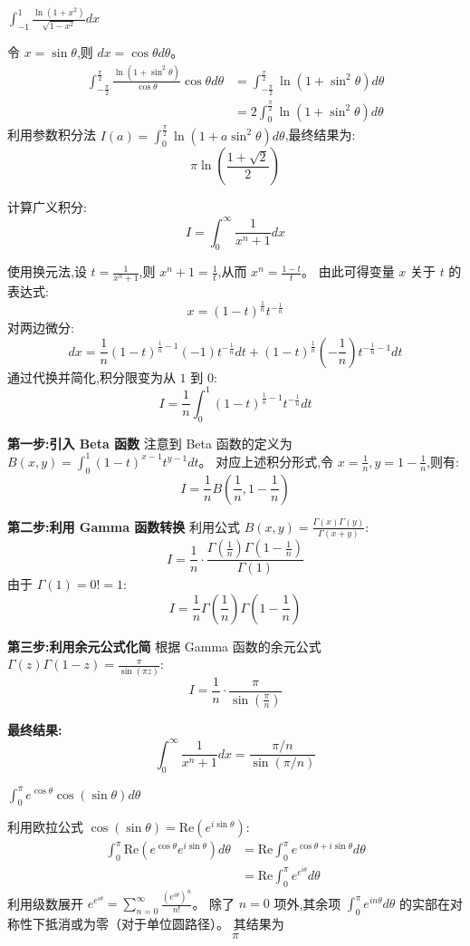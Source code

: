 \begin{questions}
\question $\int_{-1}^{1} \frac{\ln(1+x^2)}{\sqrt{1-x^2}} dx$
\begin{solution}
令 $x = \sin \theta$,则 $dx = \cos \theta d\theta$。
\begin{align*}
\int_{-\frac{\pi}{2}}^{\frac{\pi}{2}} \frac{\ln(1+\sin^2 \theta)}{\cos \theta} \cos \theta d\theta &= \int_{-\frac{\pi}{2}}^{\frac{\pi}{2}} \ln(1+\sin^2 \theta) d\theta \\
&= 2 \int_{0}^{\frac{\pi}{2}} \ln(1+\sin^2 \theta) d\theta
\end{align*}
利用参数积分法 $I(a) = \int_{0}^{\frac{\pi}{2}} \ln(1+a\sin^2 \theta) d\theta$,最终结果为:
\[ \pi \ln(\frac{1+\sqrt{2}}{2}) \]
\end{solution}
\question 
计算广义积分:\[ I = \int_{0}^{\infty} \frac{1}{x^n + 1} dx \]

\begin{solution}
使用换元法,设 $t = \frac{1}{x^n+1}$,则 $x^n+1 = \frac{1}{t}$,从而 $x^n = \frac{1-t}{t}$。
由此可得变量 $x$ 关于 $t$ 的表达式:
\[ x = (1-t)^{\frac{1}{n}} t^{-\frac{1}{n}} \]
对两边微分:
\[ dx = \frac{1}{n}(1-t)^{\frac{1}{n}-1}(-1) t^{-\frac{1}{n}} dt + (1-t)^{\frac{1}{n}} (-\frac{1}{n}) t^{-\frac{1}{n}-1} dt \]
通过代换并简化,积分限变为从 $1$ 到 $0$:
\[ I = \frac{1}{n} \int_{0}^{1} (1-t)^{\frac{1}{n}-1} t^{-\frac{1}{n}} dt \]

\textbf{第一步:引入 Beta 函数}
注意到 Beta 函数的定义为 $B(x, y) = \int_{0}^{1} (1-t)^{x-1} t^{y-1} dt$。
对应上述积分形式,令 $x = \frac{1}{n},y = 1 - \frac{1}{n}$,则有:
\[ I = \frac{1}{n} B\left(\frac{1}{n}, 1 - \frac{1}{n}\right) \]

\textbf{第二步:利用 Gamma 函数转换}
利用公式 $B(x, y) = \frac{\Gamma(x)\Gamma(y)}{\Gamma(x+y)}$:
\[ I = \frac{1}{n} \cdot \frac{\Gamma(\frac{1}{n})\Gamma(1 - \frac{1}{n})}{\Gamma(1)} \]
由于 $\Gamma(1) = 0! = 1$:
\[ I = \frac{1}{n} \Gamma\left(\frac{1}{n}\right)\Gamma\left(1 - \frac{1}{n}\right) \]

\textbf{第三步:利用余元公式化简}
根据 Gamma 函数的余元公式 $\Gamma(z)\Gamma(1-z) = \frac{\pi}{\sin(\pi z)}$:
\[ I = \frac{1}{n} \cdot \frac{\pi}{\sin(\frac{\pi}{n})} \]

\textbf{最终结果:}
\[ \int_{0}^{\infty} \frac{1}{x^n + 1} dx = \frac{\pi/n}{\sin(\pi/n)} \]
\end{solution}
\question $\int_{0}^{\pi} e^{\cos \theta} \cos(\sin \theta) d\theta$
\begin{solution}
利用欧拉公式 $\cos(\sin \theta) = \text{Re}(e^{i\sin \theta})$:
\begin{align*}
\int_{0}^{\pi} \text{Re}(e^{\cos \theta} e^{i\sin \theta}) d\theta &= \text{Re} \int_{0}^{\pi} e^{\cos \theta + i\sin \theta} d\theta \\
&= \text{Re} \int_{0}^{\pi} e^{e^{i\theta}} d\theta
\end{align*}
利用级数展开 $e^{e^{i\theta}} = \sum_{n=0}^{\infty} \frac{(e^{i\theta})^n}{n!}$。
除了 $n=0$ 项外,其余项 $\int_{0}^{\pi} e^{in\theta} d\theta$ 的实部在对称性下抵消或为零（对于单位圆路径）。
其结果为
\[ \pi \]
\end{solution}


\end{questions}
